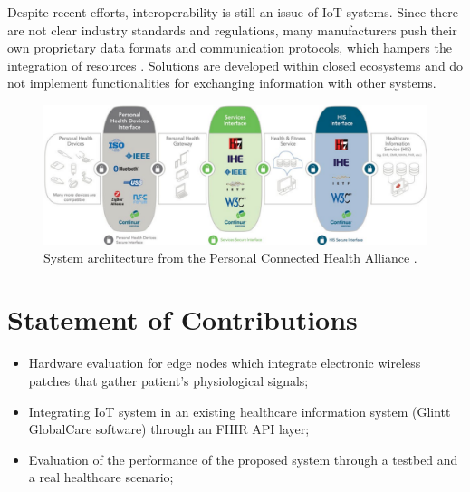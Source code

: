 Despite recent efforts, interoperability is still an issue of IoT systems. Since there are not clear industry standards and regulations, many manufacturers push their own proprietary data formats and communication protocols, which hampers the integration of resources \cite{Rubi2019}. Solutions are developed within closed ecosystems and do not implement functionalities for exchanging information with other systems. 




\begin{figure}[H]
    \centering
    \includegraphics[width=.90\linewidth]{images/cdg-architecutre.png}
    \caption{System architecture from the Personal Connected Health Alliance \cite{ContinuaHealthAlliance}.}
    \label{fig:continua-architecture}
\end{figure}

\section{Statement of Contributions}


\begin{itemize}
    \item Hardware evaluation for edge nodes which integrate electronic wireless patches that gather patient's physiological signals;
    \item Integrating IoT system in an existing healthcare information system  (Glintt GlobalCare software) through an FHIR API layer;
    \item Evaluation of the performance of the proposed system through a testbed and a real healthcare scenario;
\end{itemize}
